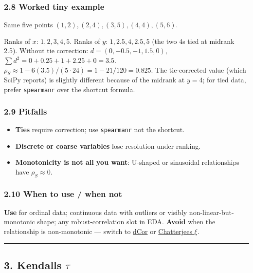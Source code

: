 \documentclass{article}
\providecommand{\tightlist}{\setlength{\itemsep}{0pt}\setlength{\parskip}{0pt}}
\begin{document}
\subsubsection{2.8 Worked tiny example}\label{28-worked-tiny-example}

Same five points \((1, 2), (2, 4), (3, 5), (4, 4), (5, 6)\).

Ranks of \(x\): \(1, 2, 3, 4, 5\). Ranks of \(y\): \(1, 2.5, 4, 2.5, 5\)
(the two 4\textquotesingle s tied at midrank 2.5). Without tie
correction: \(d = (0, -0.5, -1, 1.5, 0)\),
\(\sum d^2 = 0 + 0.25 + 1 + 2.25 + 0 = 3.5\).
\(\rho_S \approx 1 - 6(3.5)/(5 \cdot 24) = 1 - 21/120 = 0.825\). The
tie-corrected value (which SciPy reports) is slightly different
because of the midrank at \(y = 4\); for tied data, prefer
\texttt{spearmanr} over the shortcut formula.

\subsubsection{2.9 Pitfalls}\label{29-pitfalls}

\begin{itemize}
\tightlist
\item
  \textbf{Ties} require correction; use \texttt{spearmanr} not the
  shortcut.
\item
  \textbf{Discrete or coarse variables} lose resolution under ranking.
\item
  \textbf{Monotonicity is not all you want}: U-shaped or sinusoidal
  relationships have \(\rho_S \approx 0\).
\end{itemize}

\subsubsection{2.10 When to use / when
not}\label{210-when-to-use--when-not}

\textbf{Use} for ordinal data; continuous data with outliers or visibly
non-linear-but-monotonic shape; any robust-correlation slot in EDA.
\textbf{Avoid} when the relationship is non-monotonic --- switch to
\hyperref[13-distance-correlation-dcor]{dCor} or
\hyperref[17-chatterjees-rank-correlation-xi]{Chatterjee\textquotesingle s
\(\xi\)}.

\begin{center}\rule{0.5\linewidth}{0.5pt}\end{center}

\subsection{\texorpdfstring{3. Kendall\textquotesingle s
\(\tau\)}{3. Kendall\textquotesingle s \textbackslash tau}}\label{3-kendalls-tau}
\end{document}
